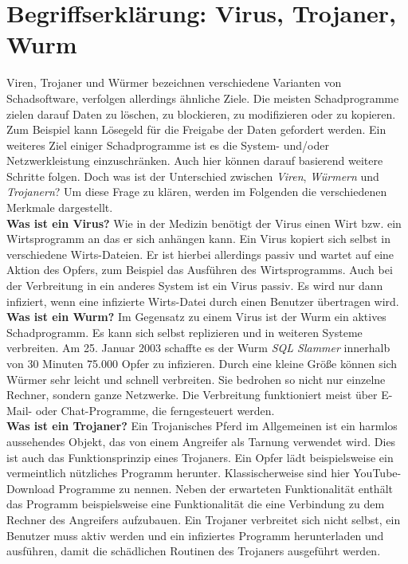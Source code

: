 \section{Begriffserklärung: Virus, Trojaner, Wurm}\label{sec:abgrenzung}
Viren, Trojaner und Würmer bezeichnen verschiedene Varianten von Schadsoftware,
verfolgen allerdings ähnliche Ziele.
Die meisten Schadprogramme zielen darauf Daten zu löschen, zu blockieren, zu modifizieren oder zu kopieren.
Zum Beispiel kann Lösegeld für die Freigabe der Daten gefordert werden.
Ein weiteres Ziel einiger Schadprogramme ist es die System- und/oder Netzwerkleistung
einzuschränken. Auch hier können darauf basierend weitere Schritte folgen.
Doch was ist der Unterschied zwischen \textit{Viren}, \textit{Würmern} und \textit{Trojanern}?
Um diese Frage zu klären, werden im Folgenden die verschiedenen Merkmale dargestellt.
\cite{KASTRO}\\

\textbf{Was ist ein Virus?}
Wie in der Medizin benötigt der Virus einen Wirt bzw. ein Wirtsprogramm an das 
er sich anhängen kann. Ein Virus kopiert sich selbst in verschiedene 
Wirts-Dateien. Er ist hierbei allerdings passiv und wartet auf eine Aktion des Opfers, 
zum Beispiel das Ausführen des Wirtsprogramms. Auch bei der Verbreitung in ein anderes
System ist ein Virus passiv. Es wird nur dann infiziert, wenn
eine infizierte Wirts-Datei durch einen Benutzer übertragen wird. \\

\textbf{Was ist ein Wurm?}
Im Gegensatz zu einem Virus ist der Wurm ein aktives Schadprogramm. Es kann sich
selbst replizieren und in weiteren Systeme verbreiten. Am 25. Januar 2003 schaffte es 
der Wurm \textit{SQL Slammer} innerhalb von 30 Minuten 75.000 Opfer zu infizieren. Durch
eine kleine Größe können sich Würmer sehr leicht und schnell verbreiten. Sie
bedrohen so nicht nur einzelne Rechner, sondern ganze Netzwerke. Die Verbreitung
funktioniert meist über E-Mail- oder Chat-Programme, die ferngesteuert werden.\\

\textbf{Was ist ein Trojaner?}
Ein Trojanisches Pferd im Allgemeinen ist ein harmlos aussehendes Objekt, das von
einem Angreifer als Tarnung verwendet wird. Dies ist auch das Funktionsprinzip eines Trojaners. 
Ein Opfer lädt beispielsweise ein vermeintlich nützliches Programm herunter.
Klassischerweise sind hier YouTube-Download Programme zu nennen.
Neben der erwarteten Funktionalität enthält
das Programm beispielsweise eine Funktionalität die eine Verbindung zu dem Rechner
des Angreifers aufzubauen. Ein Trojaner verbreitet sich nicht selbst, ein Benutzer 
muss aktiv werden und ein infiziertes Programm herunterladen und ausführen, damit die
schädlichen Routinen des Trojaners ausgeführt werden.
\cite{ABGVT}
